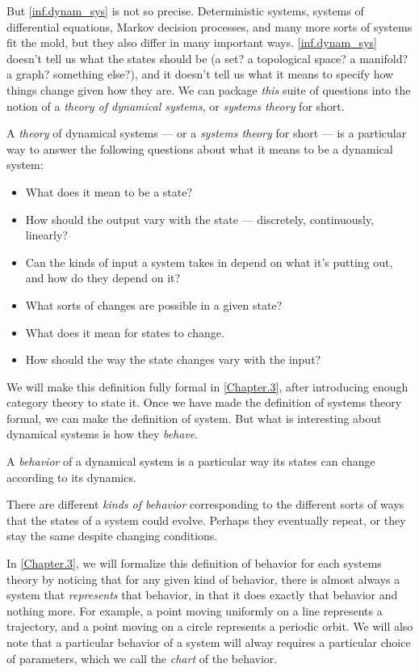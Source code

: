 \documentclass[DynamicalBook]{subfiles}
\begin{document}
But \cref{inf.dynam_sys} is not so precise. Deterministic systems, systems of differential equations, Markov decision processes, and many more sorts of systems fit the mold, but they also differ in many important ways. \cref{inf.dynam_sys} doesn't tell us what the states should be (a set? a topological space? a manifold? a graph? something else?), and it doesn't tell us what it means to specify how things change given how they are. We can package \emph{this} suite of questions into the notion of a \emph{theory of dynamical systems}, or \emph{systems theory} for short.

\begin{informal}\label{informal.doctrine}
  A \emph{theory} of dynamical systems --- or a \emph{systems theory} for short --- is a particular way to answer the following
  questions about what it means to be a dynamical system:
  \begin{itemize}
  \item What does it mean to be a state?
  \item How should the output vary with the state --- discretely,
    continuously, linearly?
  \item Can the kinds of input a
    system takes in depend on what it's putting out, and how do they depend on it?
  \item What sorts of changes are possible in a given state?
  \item What does it mean for states to change.
  \item How should the way the state changes vary with the input?
  \end{itemize}
\end{informal}

We will make this definition fully formal in \cref{Chapter.3}, after introducing enough category theory to state it. Once we have made the definition of systems theory formal, we can make the definition of system. But what is interesting about dynamical systems is how they \emph{behave}.
\begin{informal}\label{inf:behavior}
  A \emph{behavior} of a dynamical system is a particular way its states can
  change according to its dynamics.

  There are different \emph{kinds of behavior} corresponding to the different
  sorts of ways that the states of a system could evolve. Perhaps they eventually
  repeat, or they stay the same despite changing conditions.
\end{informal}

In \cref{Chapter.3}, we will formalize this definition of behavior for each systems theory by noticing that for any given kind of behavior, there is almost always a system that \emph{represents} that behavior, in that it does exactly that behavior and nothing more. For example, a point moving uniformly on a line represents a trajectory, and a point moving on a circle represents a periodic orbit. We will also note that a particular behavior of a system will alway requires a particular choice of parameters, which we call the \emph{chart} of the behavior.
\end{document}
